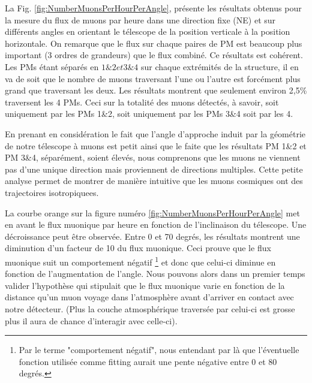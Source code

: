 \documentclass[12pt]{article}
\begin{document}
La Fig. \ref{fig:NumberMuonsPerHourPerAngle}, présente les résultats obtenus pour la mesure du flux de muons par heure dans une direction fixe (NE) et sur différents angles en orientant le télescope de la position verticale à la position horizontale. On remarque que le flux sur chaque paires de PM est beaucoup plus important (3 ordres de grandeurs) que le flux combiné.
Ce résultats est cohérent. Les PMs étant séparés en $1\&2 et 3\&4$ sur chaque extrémités de la structure, il en va de soit que le nombre de muons traversant l'une ou l'autre est forcément plus grand que traversant les deux. Les résultats montrent que seulement environ 2,5\% traversent les 4 PMs. Ceci sur la totalité des muons détectés, à savoir, soit uniquement par les PMs 1\&2, soit uniquement par les PMs 3\&4 soit par les 4.

En prenant en considération le fait que l'angle d'approche induit par la géométrie de notre télescope à muons est petit ainsi que le faite que les résultats PM 1\&2 et PM 3\&4, séparément, soient élevés, nous comprenons que les muons ne viennent pas d'une unique direction mais proviennent de directions multiples. Cette petite analyse permet de montrer de manière intuitive que les muons cosmiques ont des trajectoires isotropiquees.

La courbe orange sur la figure numéro \ref{fig:NumberMuonsPerHourPerAngle} met en avant le flux muonique par heure en fonction de l'inclinaison du télescope.
 Une décroissance peut être observée.  Entre 0 et 70 degrés, les résultats montrent une diminution d'un facteur de 10 du flux muonique. Ceci prouve que le flux muonique suit un comportement négatif \footnote{Par le terme "comportement négatif", nous entendant par là que l'éventuelle fonction utilisée comme fitting aurait une pente négative entre 0 et 80 degrés.} et donc que celui-ci diminue en fonction de l'augmentation de l'angle. Nous pouvons alors dans un premier temps valider l'hypothèse qui stipulait que le flux muonique varie en fonction de la distance qu'un muon voyage dans l'atmosphère avant d'arriver en contact avec notre détecteur. (Plus la couche atmosphérique traversée par celui-ci est grosse plus il aura de chance d'interagir avec celle-ci). 
 
\end{document}

